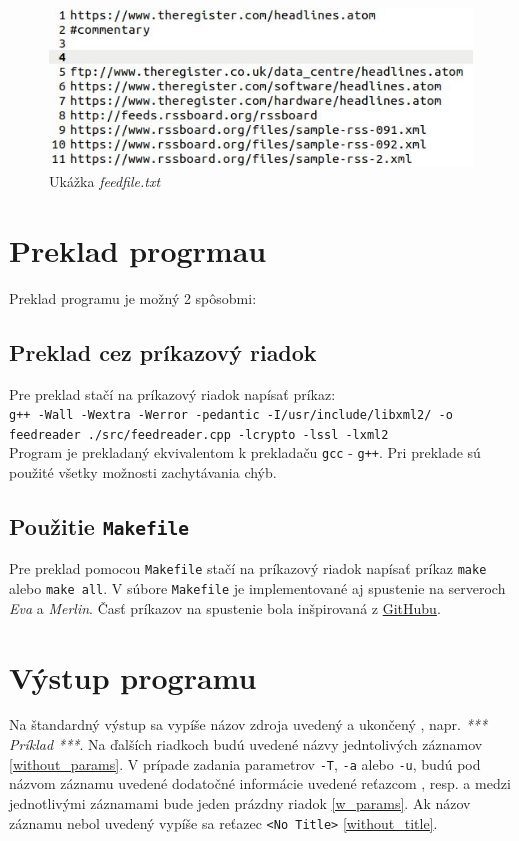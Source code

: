 \documentclass[a4paper, 11pt]{article}
\begin{document}
    \begin{figure}[h]
        \centering
        \includegraphics[width=0.8\linewidth]{img/feedfile.JPG}
        \caption{Ukážka \textit{feedfile.txt}}
        \label{feedfile_fig}
    \end{figure}
    

    \section{Preklad progrmau}
    \label{compile}
    Preklad programu je možný 2 spôsobmi:
    
    \subsection{Preklad cez príkazový riadok}
    \label{terminal}
    Pre preklad stačí na príkazový riadok napísať príkaz: \\
    
    \texttt{g++ -Wall -Wextra -Werror -pedantic -I/usr/include/libxml2/ -o feedreader ./src/feedreader.cpp -lcrypto -lssl -lxml2} \\
    
    Program je prekladaný ekvivalentom k prekladaču \texttt{gcc} - \texttt{g++}. Pri preklade sú použité všetky možnosti zachytávania chýb.
    
    \subsection{Použitie \texttt{Makefile}}
    \label{makefile}
    Pre preklad pomocou \texttt{Makefile} stačí na príkazový riadok napísať príkaz \texttt{make} alebo \texttt{make all}.
    V súbore \texttt{Makefile} je implementované aj spustenie na serveroch \textit{Eva} a \textit{Merlin}. Časť príkazov na spustenie bola inšpirovaná z \href{https://gist.github.com/jackorp/c4c2247d7be28fcfa51f24dab883299c}{GitHubu}.
    \section{Výstup programu}
    \label{output}
    Na štandardný výstup sa vypíše názov zdroja uvedený \uv{***} a ukončený \uv{***}, napr. \textit{*** Príklad ***}. Na ďalších riadkoch budú uvedené názvy jedntolivých záznamov \ref{without_params}.
    V prípade zadania parametrov \texttt{-T}, \texttt{-a} alebo \texttt{-u}, budú pod názvom záznamu uvedené dodatočné informácie uvedené reťazcom ,  resp.  a medzi jednotlivými záznamami bude jeden prázdny riadok \ref{w_params}. Ak názov záznamu nebol uvedený vypíše sa reťazec \texttt{<No Title>} \ref{without_title}.
\end{document}
